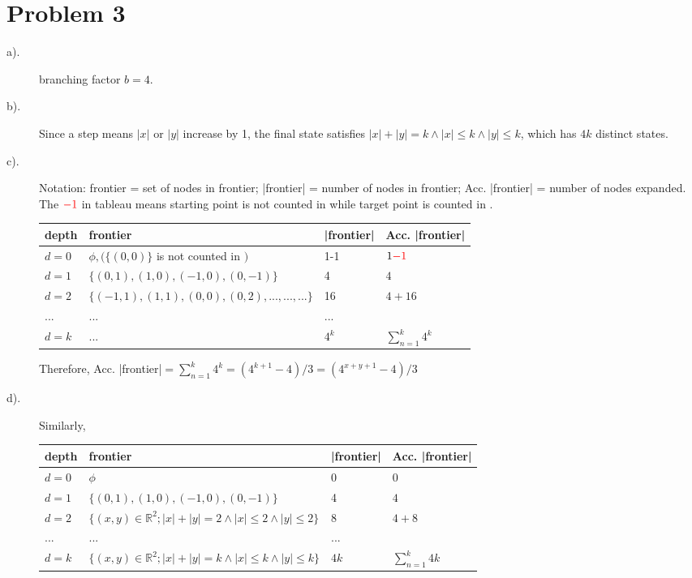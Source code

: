 \documentclass{mcmthesis}
\begin{document}
\section{Problem 3}
\begin{description}
	\item[a).] branching factor $b=4$.
	\item[b).] Since a step means $|x|$ or $|y|$ increase by 1, the final state satisfies $|x|+|y|=k \wedge |x|\le k \wedge |y| \le k$, which has $4k$ distinct states.
	\item[c).] Notation: frontier = set of nodes in frontier; |frontier| = number of nodes in frontier;   Acc. |frontier| = number of nodes expanded. The ${\color{red}-1}$ in tableau means starting point is not counted in while target point is counted in .
	
	\begin{tabular}{llll}
		\toprule
		depth & frontier                                   & |frontier| & Acc. |frontier|           \\ \midrule
		$d=0$ & $ \phi, (\{(0,0)\}$ is not counted in $)$  & 1-1        & $1{\color{red}-1}$        \\
		$d=1$ & $\{(0,1),(1,0),(-1,0),(0,-1)\}$            & 4          & $4$                       \\
		$d=2$ & $\{(-1,1),(1,1),(0,0),(0,2),...,...,...\}$ & 16         & $4+16$                    \\
		...   & ...                                        & ...        &  \\
		$d=k$ & ...                                        & $4^k$      & $\sum_{n=1}^{k} 4^k$ \\ \bottomrule
	\end{tabular}

	Therefore, Acc. |frontier|$=\sum_{n=1}^{k} 4^k={(4^{k+1}-4)}/{3}={(4^{x+y+1}-4)}/{3}$
	
	\item[d).] Similarly, 
	
	\begin{tabular}{llll}
		\toprule
		depth & frontier                                                               & |frontier| & Acc. |frontier|        \\ \midrule
		$d=0$ & $\phi$                                                            & 0          & $0$                  \\
		$d=1$ & $\{(0,1),(1,0),(-1,0),(0,-1)\}$                                        & 4          & $4$                  \\
		$d=2$ & $\{(x,y) \in \mathbb{R}^2; |x|+|y|=2\wedge |x|\le 2 \wedge |y|\le 2\}$ & 8          & $4+8$                 \\
		...   & ...                                                                    & ...        &  \\
		$d=k$ & $\{(x,y)\in \mathbb{R}^2; |x|+|y|=k\wedge |x|\le k \wedge |y|\le k\}$  & $4k$       & $\sum_{n=1}^{k} 4k$ \\ \bottomrule
	\end{tabular}


\end{description}
\end{document}
